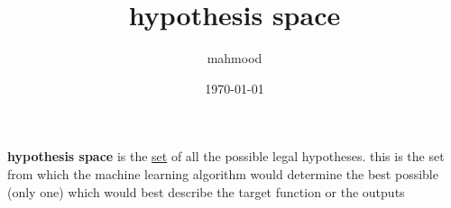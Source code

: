 \documentclass[a4paper,12pt]{article}
\author{mahmood}
\date{\today}
\title{hypothesis space}
\begin{document}
\maketitle
\begin{definition}
\textbf{hypothesis space} is the \href{discrete_maths2.org}{set} of all the possible legal hypotheses. this is the set from which the machine learning algorithm would determine the best possible (only one) which would best describe the target function or the outputs\\
\end{definition}
\end{document}
